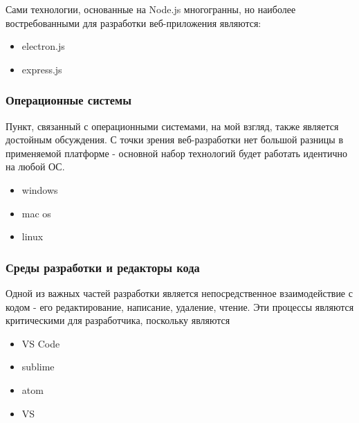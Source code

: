         Сами технологии, основанные на Node.js многогранны, но наиболее востребованными для разработки веб-приложения являются:
        \begin{itemize}
            \item electron.js
            \item express.js
        \end{itemize}

    
    \subsubsection{Операционные системы}
        Пункт, связанный с операционными системами, на мой взгляд, также является достойным обсуждения.
        С точки зрения веб-разработки нет большой разницы в применяемой платформе - основной набор технологий будет работать идентично на любой ОС.
        \begin{itemize}
            \item windows
            \item mac os
            \item linux
        \end{itemize}
    
        
    \subsubsection{Среды разработки и редакторы кода}
        Одной из важных частей разработки является непосредственное взаимодействие с кодом - его редактирование, написание, удаление, чтение.
        Эти процессы являются критическими для разработчика, поскольку являются 
        \begin{itemize}
            \item VS Code
            \item sublime
            \item atom
            \item VS
        \end{itemize}
    
